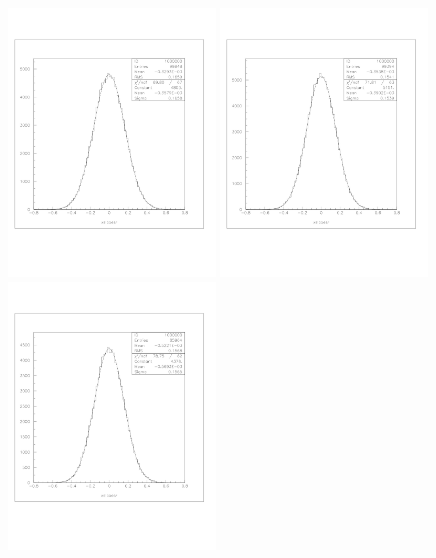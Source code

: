 \documentclass[a4paper]{article}
\begin{document}
\begin{figure}[!htb]
  \centering
  \includegraphics[width=0.49\textwidth]{ex_images/1_050_010_xse.jpg}
  \includegraphics[width=0.49\textwidth]{ex_images/1_050_030_xse.jpg}
  \includegraphics[width=0.49\textwidth]{ex_images/1_050_050_xse.jpg}

\end{figure}
\end{document}
